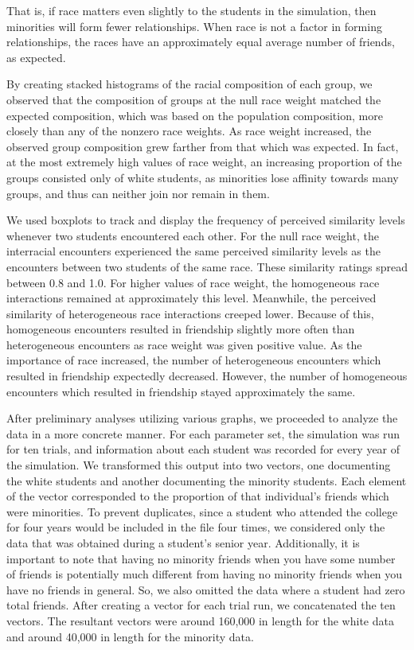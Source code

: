 That is, if race matters even 
slightly to the students in the simulation, then minorities will form fewer relationships. When race is not a factor in 
forming relationships, the races have an approximately equal average number of friends, as expected.

By creating stacked histograms of the racial composition of each group, we observed that the composition of groups at the null 
race weight matched the expected composition, which was based on the population composition, more closely than any of the 
nonzero race weights. As race weight increased, the observed group composition grew farther from that which was expected. In 
fact, at the most extremely high values of race weight, an increasing proportion of the groups consisted only of white 
students, as minorities lose affinity towards many groups, and thus can neither join nor remain in them.

We used boxplots to track and display the frequency of perceived similarity levels whenever two students encountered each 
other. For the null race weight, the interracial encounters experienced the same perceived similarity levels as the 
encounters between two students of the same race. These similarity ratings spread between 0.8 and 1.0. For higher values of 
race weight, the homogeneous race interactions remained at approximately this level. Meanwhile, the perceived similarity of 
heterogeneous race interactions creeped lower. Because of this, homogeneous encounters resulted in friendship slightly more 
often than heterogeneous encounters as race weight was given positive value. As the importance of race increased, the number 
of heterogeneous encounters which resulted in friendship expectedly decreased. However, the number of homogeneous encounters 
which resulted in friendship stayed approximately the same.

After preliminary analyses utilizing various graphs, we proceeded to analyze the data in a more concrete manner. For each 
parameter set, the simulation was run for ten trials, and information about each student was recorded for every year of the 
simulation. We transformed this output into two vectors, one documenting the white students and another documenting the 
minority students. Each element of the vector corresponded to the proportion of that individual's friends which were 
minorities. To prevent duplicates, since a student who attended the college for four years would be included in the file four 
times, we considered only the data that was obtained during a student's senior year. Additionally, it is important to note 
that having no minority friends when you have some number of friends is potentially much different from having no 
minority friends when you have no friends in general. So, we also omitted the data where a student had zero total friends. 
After creating a vector for each trial run, we concatenated the ten vectors. The resultant vectors were around 160,000 in 
length for the white data and around 40,000 in length for the minority data.

